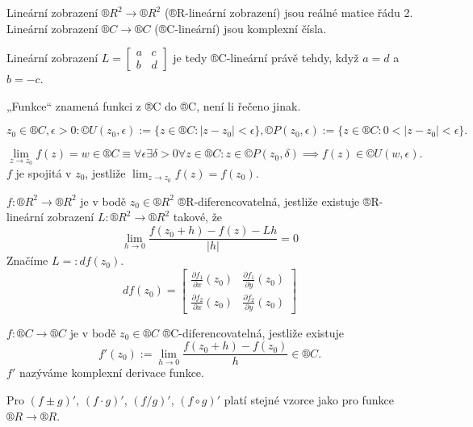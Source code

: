 \documentclass[12pt]{article}					%
\begin{document}
\begin{poznamka}
	Lineární zobrazení $®R^2 \rightarrow ®R^2$ (®R-lineární zobrazení) jsou reálné matice řádu 2. Lineární zobrazení $®C \rightarrow ®C$ (®C-lineární) jsou komplexní čísla.

	Lineární zobrazení $L = \begin{bmatrix} a & c \\ b & d \end{bmatrix}$ je tedy ®C-lineární právě tehdy, když $a = d$ a $b = -c$.
\end{poznamka}

\begin{poznamka}[Úmluva]
	„Funkce“ znamená funkci z ®C do ®C, není li řečeno jinak.
\end{poznamka}

\begin{definice}
	$$ z_0 \in ®C, \epsilon > 0: ©U(z_0, \epsilon):=\{z \in ®C: |z - z_0| < \epsilon\}, ©P(z_0, \epsilon) := \{z \in ®C: 0 < |z - z_0| < \epsilon\}. $$
\end{definice}

\begin{definice}
	$$ \lim_{z \rightarrow z_0} f(z) = w \in ®C ≡ \forall \epsilon \exists \delta > 0 \forall z \in ®C: z \in ©P(z_0, \delta) \implies f(z) \in ©U(w, \epsilon). $$
	$f$ je spojitá v $z_0$, jestliže $\lim_{z \rightarrow z_0} f(z) = f(z_0)$.
\end{definice}

\begin{definice}[Derivace]
	$f: ®R^2 \rightarrow ®R^2$ je v bodě $z_0 \in ®R^2$ ®R-diferencovatelná, jestliže existuje ®R-lineární zobrazení $L: ®R^2 \rightarrow ®R^2$ takové, že
	$$ \lim_{h \rightarrow 0} \frac{f(z_0 + h) - f(z) - Lh}{|h|} = 0 $$
	Značíme $L =: df(z_0)$.
	$$ df(z_0) = \begin{bmatrix} \frac{\partial f_1}{\partial x}(z_0) & \frac{\partial f_1}{\partial y}(z_0) \\ \frac{\partial f_2}{\partial x}(z_0) & \frac{\partial f_2}{\partial y}(z_0) \end{bmatrix}  $$

	$f: ®C \rightarrow ®C$ je v bodě $z_0 \in ®C$ ®C-diferencovatelná, jestliže existuje
	$$ f'(z_0) := \lim_{h \rightarrow 0} \frac{f(z_0 + h) - f(z_0)}{h} \in ®C. $$
	$f'$ nazýváme komplexní derivace funkce.
\end{definice}

\begin{poznamka}
	Pro $(f±g)'$, $(f·g)'$, $(f / g)'$, $(f \circ g)'$ platí stejné vzorce jako pro funkce $®R \rightarrow ®R$.
\end{poznamka}
\end{document}
